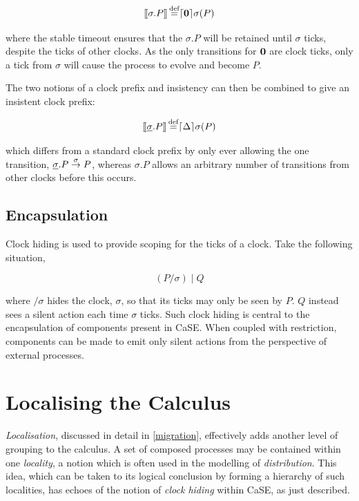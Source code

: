 \begin{equation}
[\hspace{-0.3ex}[ \sigma.P ]\hspace{-0.3ex}] \operatorname{\stackrel{\textrm{def}}{=}} \lceil{\textbf{0}}\rceil {\sigma} ({P})
\end{equation}

\noindent where the stable timeout ensures that the $\sigma.P$ will be
retained until $\sigma$ ticks, despite the ticks of other clocks.  As
the only transitions for $\textbf{0}$ are clock ticks, only a tick from
$\sigma$ will cause the process to evolve and become $P$.

The two notions of a clock prefix and insistency can then be combined
to give an insistent clock prefix:

\begin{equation}
[\hspace{-0.3ex}[ \underline{\sigma}.P ]\hspace{-0.3ex}] \operatorname{\stackrel{\textrm{def}}{=}} \lceil{\Delta}\rceil {\sigma} ({P})
\end{equation}

\noindent which differs from a standard clock prefix by only ever
allowing the one transition, $\underline{\sigma}.P \stackrel{\sigma}{\rightarrow}
P$, whereas $\sigma.P$ allows an arbitrary number of transitions from
other clocks before this occurs.

\subsection{Encapsulation}

Clock hiding is used to provide scoping for the ticks of a
clock.  Take the following situation,

\begin{equation}
\label{clockhidingex}
  (P / \sigma)\;|\;Q
\end{equation}

\noindent where $/ \sigma$ hides the clock, $\sigma$, so that its
ticks may only be seen by $P$.  $Q$ instead sees a silent action each
time $\sigma$ ticks.  Such clock hiding is central to the
encapsulation of components present in CaSE.  When coupled with
restriction, components can be made to emit only silent actions from
the perspective of external processes.

\section{Localising the Calculus}

\emph{Localisation}, discussed in detail in \ref{migration}, effectively
adds another level of grouping to the calculus.  A set of composed
processes may be contained within one \emph{locality}, a notion which is
often used in the modelling of \emph{distribution}.  This idea, which
can be taken to its logical conclusion by forming a hierarchy of such
localities, has echoes of the notion of \emph{clock hiding} within CaSE,
as just described.

